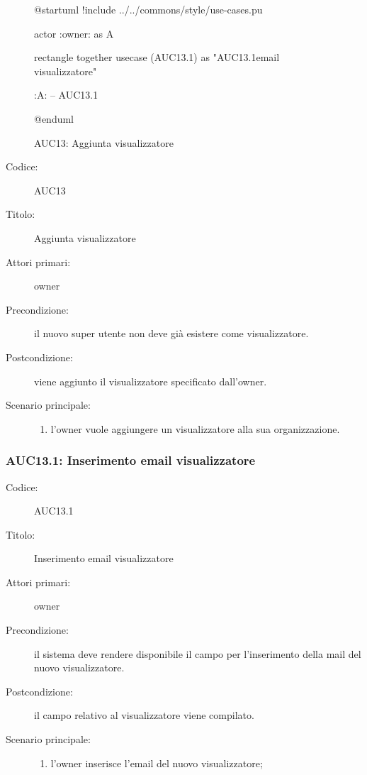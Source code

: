 \documentclass[../../../analisi-dei-requisiti.tex]{subfiles}
\begin{document}
\begin{figure}[H]
  \centering
  \begin{plantuml}
  @startuml
  !include ../../commons/style/use-cases.pu

  actor :owner: as A

  rectangle {
    together {
      usecase (AUC13.1) as "AUC13.1\nInserimento email visualizzatore"
    }
  }

  :A: -- AUC13.1

  @enduml
  \end{plantuml}
  \caption{AUC13: Aggiunta visualizzatore}
  \label{fig:auc13}
\end{figure}

\begin{description}
  \item[Codice:] AUC13
  \item[Titolo:] Aggiunta visualizzatore
  \item[Attori primari:] owner
  \item[Precondizione:] il nuovo super utente non deve già esistere come visualizzatore.
  \item[Postcondizione:] viene aggiunto il visualizzatore specificato dall'owner.
  \item[Scenario principale:]
  \begin{enumerate}
    \item l'owner vuole aggiungere un visualizzatore alla sua organizzazione.
  \end{enumerate}
\end{description}

\subsubsection{AUC13.1: Inserimento email visualizzatore}%
\label{subs:AUC13.1}
\begin{description}
  \item[Codice:] AUC13.1
  \item[Titolo:] Inserimento email visualizzatore
  \item[Attori primari:] owner
  \item[Precondizione:] il sistema deve rendere disponibile il campo per l'inserimento della mail del nuovo visualizzatore.
  \item[Postcondizione:] il campo relativo al visualizzatore viene compilato.
  \item[Scenario principale:]
  \begin{enumerate}
    \item l'owner inserisce l'email del nuovo visualizzatore;
  \end{enumerate}
\end{description}
\end{document}

